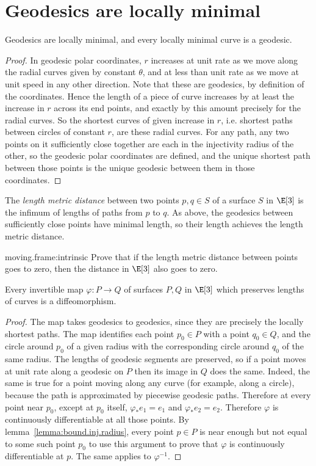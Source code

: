 \section{Geodesics are locally minimal}
\begin{theorem}
Geodesics are locally minimal, and every locally minimal curve is a geodesic.
\end{theorem}
\begin{proof}
In geodesic polar coordinates, \(r\) increases at unit rate as we move along the radial curves given by constant \(\theta\), and at less than unit rate as we move at unit speed in any other direction.
Note that these are geodesics, by definition of the coordinates.
Hence the length of a piece of curve increases by at least the increase in \(r\) across its end points, and exactly by this amount precisely for the radial curves.
So the shortest curves of given increase in \(r\), i.e. shortest paths between circles of constant \(r\), are these radial curves.
For any path, any two points on it sufficiently close together are each in the injectivity radius of the other, so the geodesic polar coordinates are defined, and the unique shortest path between those points is the unique geodesic between them in those coordinates.
\end{proof}

The \emph{length metric distance} between two points \(p, q \in S\) of a surface \(S\) in \(\E[3]\) is the infimum of lengths of paths from \(p\) to \(q\).
As above, the geodesics between sufficiently close points have minimal length, so their length achieves the length metric distance.
\begin{problem}{moving.frame:intrinsic}
Prove that if the length metric distance between points goes to zero, then the distance in \(\E[3]\) also goes to zero.
\end{problem}

\begin{corollary}\label{corollary:isometry.smooth}
Every invertible map \(\varphi\colon P \to Q\) of surfaces \(P, Q\) in \(\E[3]\) which preserves lengths of curves is a diffeomorphism.  
\end{corollary}
\begin{proof}
The map takes geodesics to geodesics, since they are precisely the locally shortest paths.
The map identifies each point \(p_0 \in P\) with a point \(q_0 \in Q\), and the circle around \(p_0\) of a given radius with the corresponding circle around \(q_0\) of the same radius.
The lengths of geodesic segments are preserved, so if a point moves at unit rate along a geodesic on \(P\) then its image in \(Q\) does the same.
Indeed, the same is true for a point moving along any curve (for example, along a circle), because the path is approximated by piecewise geodesic paths.
Therefore at every point near \(p_0\), except at \(p_0\) itself, \(\varphi_* e_1=e_1\) and \(\varphi_* e_2=e_2\).
Therefore \(\varphi\) is continuously differentiable at all those points.
By lemma~\vref{lemma:bound.inj.radius}, every point \(p \in P\) is near enough but not equal to some such point \(p_0\) to use this argument to prove that \(\varphi\) is continuously differentiable at \(p\).
The same applies to \(\varphi^{-1}\).
\end{proof}

